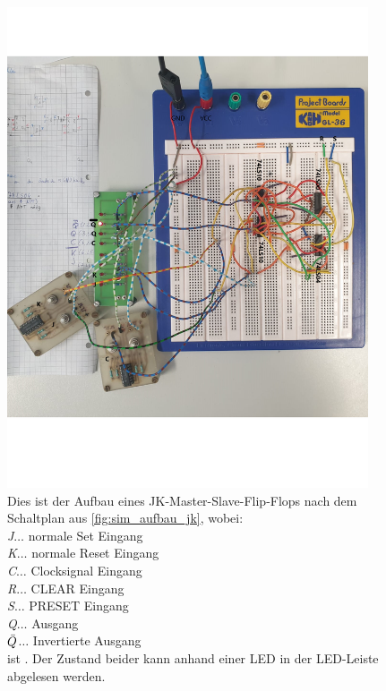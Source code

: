 \documentclass[12pt,english,ngerman]{scrartcl}
\begin{document}
\begin{figure}[H]
  \centering
    \includegraphics[width=0.95\textwidth]{./figures/messungen/jk/aufbau.png}
  \caption{Dies ist der Aufbau eines JK-Master-Slave-Flip-Flops nach dem
  Schaltplan aus \autoref{fig:sim_aufbau_jk}, wobei:\\
    \textit{J}$\dots$ normale Set Eingang\\
    \textit{K}$\dots$ normale Reset Eingang\\
    \textit{C}$\dots$ Clocksignal Eingang\\
    \textit{R}$\dots$ CLEAR Eingang\\
    \textit{S}$\dots$ PRESET Eingang\\
    \textit{Q}$\dots$ Ausgang\\
    \textit{$\Bar{Q}$}$\dots$ Invertierte Ausgang\\
ist . Der Zustand
  beider kann anhand einer LED in der LED-Leiste abgelesen werden.}
  \label{fig:mess_aufbau_jk}
\end{figure}
\end{document}
